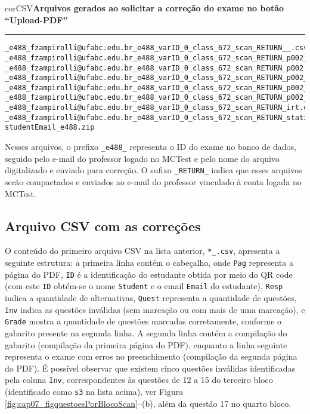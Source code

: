 \begin{myboxCode}{corCSV}{\textbf{Arquivos gerados ao solicitar a correção do exame no botão ``Upload-PDF''}}\vspace{3mm}
\hrule
\begin{verbatim}
_e488_fzampirolli@ufabc.edu.br_e488_varID_0_class_672_scan_RETURN__.csv
_e488_fzampirolli@ufabc.edu.br_e488_varID_0_class_672_scan_RETURN_p002_s3_q002.png
_e488_fzampirolli@ufabc.edu.br_e488_varID_0_class_672_scan_RETURN_p002_s3_q003.png
_e488_fzampirolli@ufabc.edu.br_e488_varID_0_class_672_scan_RETURN_p002_s3_q004.png
_e488_fzampirolli@ufabc.edu.br_e488_varID_0_class_672_scan_RETURN_p002_s3_q005.png
_e488_fzampirolli@ufabc.edu.br_e488_varID_0_class_672_scan_RETURN_p002_s4_q001_D_OK.png
_e488_fzampirolli@ufabc.edu.br_e488_varID_0_class_672_scan_RETURN_irt.csv
_e488_fzampirolli@ufabc.edu.br_e488_varID_0_class_672_scan_RETURN_statistics.csv
studentEmail_e488.zip
\end{verbatim}
\end{myboxCode}

Nesses arquivos, o prefixo \verb|_e488_| representa o ID do exame no banco de dados, seguido pelo e-mail do professor logado no MCTest e pelo nome do arquivo digitalizado e enviado para correção. O sufixo \verb|_RETURN_| indica que esses arquivos serão compactados e enviados ao e-mail do professor vinculado à conta logada no MCTest. 

\subsection{Arquivo CSV com as correções}\label{sec:CSVcorrecoesQR}

O conteúdo do primeiro arquivo CSV na lista anterior, \verb|*_.csv|, apresenta a seguinte estrutura: a primeira linha contém o cabeçalho, onde \verb|Pag| representa a página do PDF, \verb|ID| é a identificação do estudante obtida por meio do QR code (com este \verb|ID| obtém-se o nome \verb|Student| e o email \verb|Email| do estudante), \verb|Resp| indica a quantidade de alternativas, \verb|Quest| representa a quantidade de questões, \verb|Inv| indica as questões inválidas (sem marcação ou com mais de uma marcação), e \verb|Grade| mostra a quantidade de questões marcadas corretamente, conforme o gabarito presente na segunda linha. A segunda linha contém a compilação do gabarito (compilação da primeira página do PDF), enquanto a linha seguinte representa o exame com erros no preenchimento (compilação da segunda página do PDF). É possível observar que existem cinco questões inválidas identificadas pela coluna \verb|Inv|, correspondentes às questões de 12 a 15 do terceiro bloco (identificado como \verb|s3| na lista acima), ver Figura \ref{fig:cap07_figquestoesPorBlocoScan}--(b), além da questão 17 no quarto bloco. 

